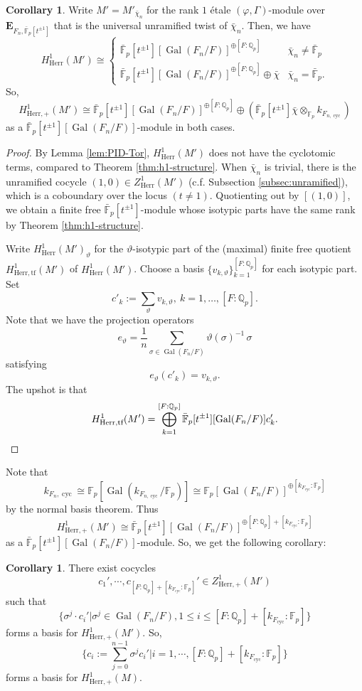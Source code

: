 \documentclass[11pt]{amsart}
\newcommand{\MINOREDITED}[1]{#1}
\theoremstyle{definition}
\newtheorem{cor}[thm]{Corollary}
\newcommand{\Q}{\mathbb{Q}}
\newcommand{\F}{\mathbb{F}}
\newcommand{\bfE}{\mathbf{E}}
\newcommand{\bFp}{\bar{\mathbb{F}}_p}
\newcommand{\cyc}{{\operatorname{cyc}}}
\newcommand{\dkF}{[k_{F_{\cyc}}:\F_p]}
\newcommand{\dF}{[F:\Q_p]}
\DeclareMathOperator{\Gal}{Gal}
\newcommand{\Herr}{\mathrm{Herr}}
\begin{document}
\begin{cor}
Write $M'=M'_{\bar\chi_n}$ for the rank $1$ \'etale
$(\varphi, \Gamma)$-module
over $\bfE_{F_n,\bFp[t^{\pm 1}]}$
that is the universal unramified twist
of $\bar\chi_n$.
Then, we have
\[
H^1_{\Herr}(M')
\cong
\begin{cases}
\bFp[t^{\pm1}][\Gal(F_n/F)]^{\oplus [F:\Q_p]}
& \bar\chi_n\neq \bFp \\
\bFp[t^{\pm1}][\Gal(F_n/F)]^{\oplus [F:\Q_p]}
\oplus \bar\chi
& \bar\chi_n= \bFp.
\end{cases}
\]
So, 
\[
H^1_{\Herr,+}(M')
\cong
\bFp[t^{\pm1}][\Gal(F_n/F)]^{\oplus [F:\Q_p]}
\oplus 
(\bFp[t^{\pm1}]\bar\chi \otimes_{\F_p} k_{F_{n,\cyc}})
\]
as a $\bFp[t^{\pm 1}][\Gal(F_n/F)]$-module
in both cases.
\end{cor}

\begin{proof}
By Lemma \ref{lem:PID-Tor},
$H^1_{\Herr}(M')$
does not have the cyclotomic terms,
compared to Theorem \ref{thm:h1-structure}.
When $\bar\chi_n$ is trivial,
there is the unramified
cocycle $(1,0)\in Z^1_{\Herr}(M')$ (c.f. Subsection
\ref{subsec:unramified}),
which is a coboundary over the locus
$(t\neq 1)$.
Quotienting out by $[(1,0)]$,
we obtain a finite free
$\bFp[t^{\pm1}]$-module
whose isotypic parts
have the same rank by Theorem \ref{thm:h1-structure}.

Write $H^1_{\Herr}(M')_{\vartheta}$
for the $\vartheta$-isotypic part
of the (maximal) finite free quotient
$H^1_{\Herr, \text{tf}}(M')$
of $H^1_{\Herr}(M')$.
Choose a basis
$\{v_{k, \vartheta}\}_{k=1}^{[F:\Q_p]}$
for each isotypic part.
Set
\[
c'_k:=\sum_{\vartheta} v_{k, \vartheta},~
k=1,\dots,[F:\Q_p].
\]
Note that we have the projection operators
$$e_\vartheta = \frac{1}{\MINOREDITED{n}} \sum_{\sigma \in \Gal(F_n/F)} \vartheta(\sigma)^{-1} \, \sigma$$
satisfying
\[
e_\vartheta(c'_k) = v_{k, \vartheta}.
\]
The upshot is that
\[
H^1_{\Herr,\text{tf}}(M')=
\bigoplus_{k=1}^{[F:\Q_p]}
\bFp[t^{\pm1}][\Gal(F_n/F)]c'_k.
\qedhere
\]
\end{proof}

Note that
\[
k_{F_n,\cyc}\cong\F_p[\Gal(k_{F_{n,\cyc}}/\F_p)]
\cong\F_p[\Gal(F_n/F)]^{\oplus \dkF}
\]
by the normal basis theorem.
Thus
\[
H^1_{\Herr,+}(M')
\cong
\bFp[t^{\pm1}][\Gal(F_n/F)]^{\oplus \dF+\dkF}
\]
as a $\bFp[t^{\pm 1}][\Gal(F_n/F)]$-module.
So, we get the following corollary:

\begin{cor}
\label{cor:Ggen}
There \MINOREDITED{exist} cocycles
\[
c_1',\cdots, c_{\dF+\dkF}'\in
Z^1_{\Herr,+}(M')
\]
such that
\[
\{\sigma^j\cdot c_i'|\sigma^j\in\Gal(F_n/F),
1\le i\le \dF+\dkF\}
\]
forms a basis for $H^1_{\Herr,+}(M')$.
So,
\[
\{c_i:=\sum_{j=0}^{n-1}\MINOREDITED{\sigma^j}c_i'|
i=1,\cdots, \dF+\dkF\}
\]
forms a basis for $H^1_{\Herr,+}(M)$.
\end{cor}
\end{document}
